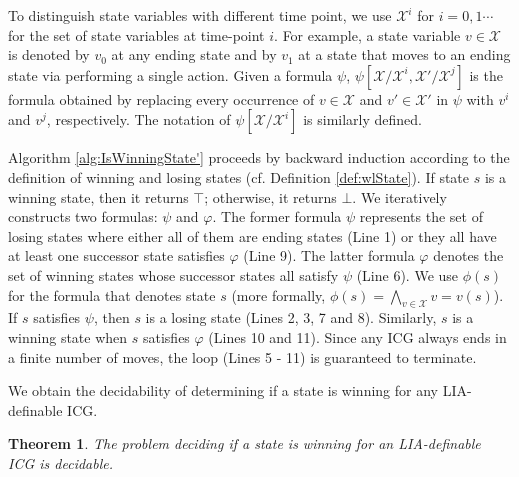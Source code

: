 \documentclass[review]{elsarticle}
\newcommand{\true}{\top}
\newcommand{\false}{\bot}
\newcommand{\statevar}{\mathcal{X}}
\newtheorem{theorem}{Theorem}
\begin{document}
	To distinguish state variables with different time point, we use $\statevar^{i}$ for $i = 0, 1 \cdots$ for the set of state variables at time-point $i$.
	For example, a state variable $v \in \statevar$ is denoted by $v_0$ at any ending state and by $v_1$ at a state that moves to an ending state via performing a single action.
	Given a formula $\psi$, $\psi[\statevar/\statevar^i,\statevar'/\statevar^j]$ is the formula obtained by replacing every occurrence of $v \in \statevar$ and $v' \in \statevar'$ in $\psi$ with $v^i$ and $v^j$, respectively.
	The notation of $\psi[\statevar/\statevar^i]$ is similarly defined.
	
	Algorithm \ref{alg:IsWinningState'} proceeds by backward induction according to the definition of winning and losing states (cf. Definition \ref{def:wlState}).
	If state $s$ is a winning state, then it returns $\true$; otherwise, it returns $\false$.
	We iteratively constructs two formulas: $\psi$ and $\varphi$.
	The former formula $\psi$ represents the set of losing states where either all of them are ending states (Line 1) or they all have at least one successor state satisfies $\varphi$ (Line 9).
	The latter formula $\varphi$ denotes the set of winning states whose successor states all satisfy $\psi$ (Line 6).
	We use $\phi(s)$ for the formula that denotes state $s$ (more formally, $\phi(s) = \bigwedge_{v \in \statevar} v = v(s)$).
	If $s$ satisfies $\psi$, then $s$ is a losing state (Lines 2, 3, 7 and 8).
	Similarly, $s$ is a winning state when $s$ satisfies $\varphi$ (Lines 10 and 11).		
	Since any ICG always ends in a finite number of moves, the loop (Lines 5 - 11) is guaranteed to terminate.
	
	We obtain the decidability of determining if a state is winning for any LIA-definable ICG.

	\begin{theorem} \label{thm:isWinState}
    	The problem deciding if a state is winning for an LIA-definable ICG is decidable.
    \end{theorem}
\end{document}
